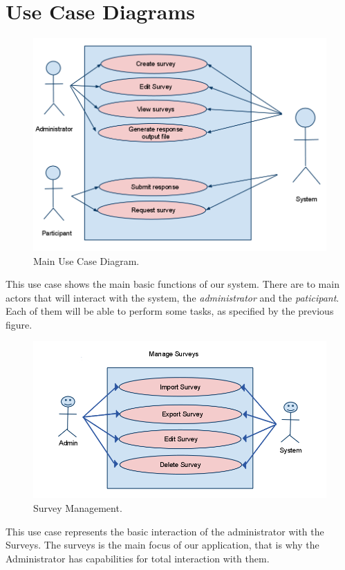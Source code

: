\documentclass[a4paper,12pt,oneside]{report}
\begin{document}
\section{Use Case Diagrams}
\vskip 1cm
\begin{figure}[h!]
  \begin{center}
   \includegraphics[width=12.2cm]{pics/usecase.png}
  \end{center}
\caption{Main Use Case Diagram.}
\end{figure}
\vskip 1cm
This use case shows the main basic functions of our system. There are to main actors that will interact with the system, the \emph{administrator} and the \emph{paticipant}. Each of them will be able to perform some tasks, as specified by the previous figure.

\newpage
\vskip 1cm
\begin{figure}[h!]
  \begin{center}
   \includegraphics[width=15cm]{pics/manageSurveys.png}
  \end{center}
\caption{Survey Management.}
\end{figure}
\vskip 1cm
This use case represents the basic interaction of the administrator with the Surveys. The surveys is the main focus of our application, that is why the Administrator has capabilities for total interaction with them.
\end{document}
